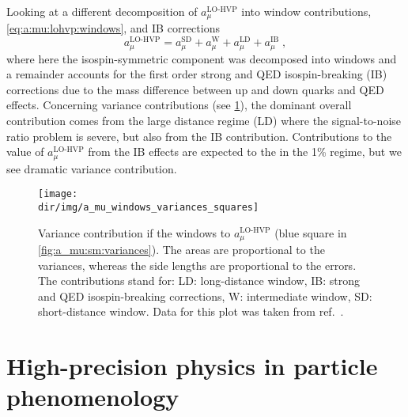 Looking at a different decomposition of $a_{\mu}^{\text{LO-HVP}}$ into window contributions, \cref{eq:a:mu:lohvp:windows}, and IB corrections
\begin{equation}
a_{\mu}^{\text{LO-HVP}} = a_{\mu}^{\text{SD}} + a_{\mu}^{\text{W}} + a_{\mu}^{\text{LD}} + a_{\mu}^{\text{IB}} \;,
\end{equation}
where here the isospin-symmetric component was decomposed into windows and a remainder accounts for the first order strong and QED isospin-breaking (IB) corrections due to the mass difference between up and down quarks and QED effects.
Concerning variance contributions (see \cref{fig:a_mu:windows:variances}), the dominant overall contribution comes from the large distance regime (LD) where the signal-to-noise ratio problem is severe, but also from the IB contribution.
Contributions to the value of $a_{\mu}^{\text{LO-HVP}}$ from the IB effects are expected to the in the 1\% regime, but we see dramatic variance contribution.
\begin{figure}
\centering
\texttt{[image: \\dir/img/a\_mu\_windows\_variances\_squares]}
\caption{
Variance contribution if the windows to $a_{\mu}^{\text{LO-HVP}}$ (blue square in \cref{fig:a_mu:sm:variances}).
The areas are proportional to the variances, whereas the side lengths are proportional to the errors.
The contributions stand for: LD: long-distance window, IB: strong and QED isospin-breaking corrections, W: intermediate window, SD: short-distance window.
Data for this plot was taken from ref.~\cite{snowmass:2025}.
}
\label{fig:a_mu:windows:variances}
\end{figure}





















\section{High-precision physics in particle phenomenology}

